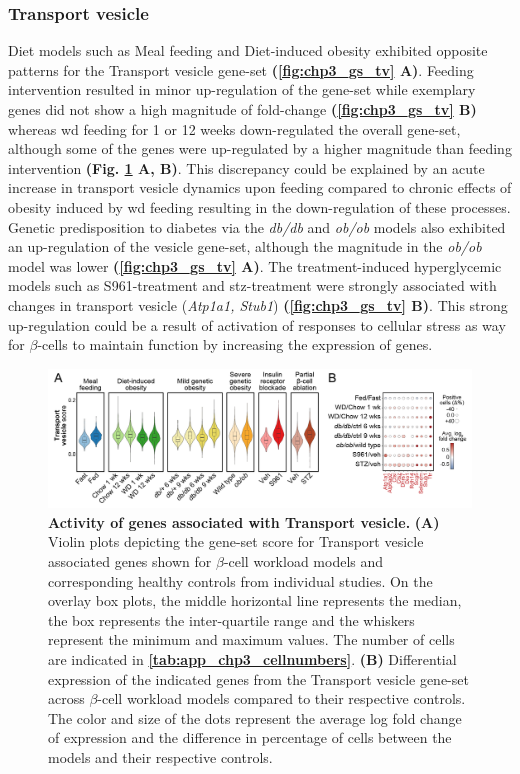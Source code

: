 \subsubsection{Transport vesicle}
Diet models such as Meal feeding and Diet-induced obesity exhibited opposite patterns for the Transport vesicle gene-set \textbf{(\autoref{fig:chp3_gs_tv} A)}. Feeding intervention resulted in minor up-regulation of the gene-set while exemplary genes did not show a high magnitude of fold-change \textbf{(\autoref{fig:chp3_gs_tv} B)} whereas \gls{wd} feeding for 1 or 12 weeks down-regulated the overall gene-set, although some of the genes were up-regulated by a higher magnitude than feeding intervention \textbf{(Fig. \ref{fig:chp3_gs_tv} A, B)}. This discrepancy could be explained by an acute increase in transport vesicle dynamics upon feeding compared to chronic effects of obesity induced by \gls{wd} feeding resulting in the down-regulation of these processes. Genetic predisposition to diabetes via the \textit{db/db} and \textit{ob/ob} models also exhibited an up-regulation of the vesicle gene-set, although the magnitude in the \textit{ob/ob} model was lower \textbf{(\autoref{fig:chp3_gs_tv} A)}. The treatment-induced hyperglycemic models such as S961-treatment and \gls{stz}-treatment were strongly associated with changes in transport vesicle (\textit{Atp1a1, Stub1}) \textbf{(\autoref{fig:chp3_gs_tv} B)}. This strong up-regulation could be a result of activation of responses to cellular stress as way for $\beta$-cells to maintain function by increasing the expression of genes.\\

\begin{figure}[H]
\centering
\includegraphics[width=\linewidth]{Chapter5/Fig/F3-13-05.png}
\caption[Activity of genes associated with transport vesicle]{\textbf{Activity of genes associated with Transport vesicle.} \textbf{(A)} Violin plots depicting the gene-set score for Transport vesicle associated genes shown for $\beta$-cell workload models and corresponding healthy controls from individual studies. On the overlay box plots, the middle horizontal line represents the median, the box represents the inter-quartile range and the whiskers represent the minimum and maximum values. The number of cells are indicated in \textbf{\autoref{tab:app_chp3_cellnumbers}}. \textbf{(B)} Differential expression of the indicated genes from the Transport vesicle gene-set across $\beta$-cell workload models compared to their respective controls. The color and size of the dots represent the average log fold change of expression and the difference in percentage of cells between the models and their respective controls.}
\label{fig:chp3_gs_tv}
\end{figure}


